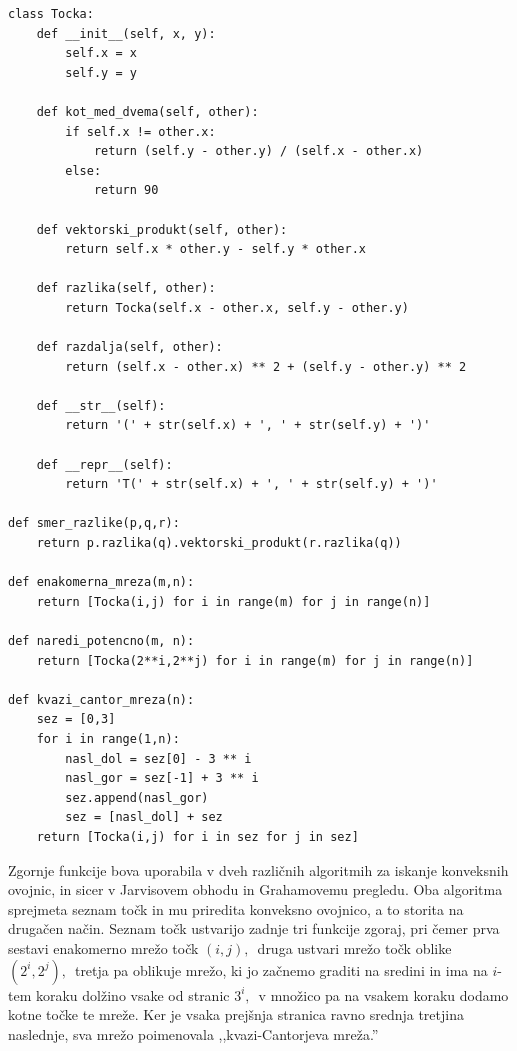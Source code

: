 \documentclass[a4paper]{article}
\begin{document}
\begin{lstlisting}
class Tocka:
    def __init__(self, x, y):
        self.x = x
        self.y = y

    def kot_med_dvema(self, other):
        if self.x != other.x:
            return (self.y - other.y) / (self.x - other.x)
        else:
            return 90

    def vektorski_produkt(self, other): 
        return self.x * other.y - self.y * other.x

    def razlika(self, other):
    	return Tocka(self.x - other.x, self.y - other.y)

    def razdalja(self, other):
        return (self.x - other.x) ** 2 + (self.y - other.y) ** 2

    def __str__(self):
        return '(' + str(self.x) + ', ' + str(self.y) + ')'

    def __repr__(self):
        return 'T(' + str(self.x) + ', ' + str(self.y) + ')'

def smer_razlike(p,q,r):
    return p.razlika(q).vektorski_produkt(r.razlika(q))

def enakomerna_mreza(m,n):
    return [Tocka(i,j) for i in range(m) for j in range(n)]

def naredi_potencno(m, n):
    return [Tocka(2**i,2**j) for i in range(m) for j in range(n)]

def kvazi_cantor_mreza(n):
    sez = [0,3]
    for i in range(1,n):
        nasl_dol = sez[0] - 3 ** i
        nasl_gor = sez[-1] + 3 ** i
        sez.append(nasl_gor)
        sez = [nasl_dol] + sez
    return [Tocka(i,j) for i in sez for j in sez]
\end{lstlisting}

Zgornje funkcije bova uporabila v dveh različnih algoritmih za iskanje konveksnih ovojnic, in sicer v Jarvisovem obhodu in Grahamovemu pregledu.
Oba algoritma sprejmeta seznam točk in mu priredita konveksno ovojnico, a to storita na drugačen način.
Seznam točk ustvarijo zadnje tri funkcije zgoraj, pri čemer prva sestavi enakomerno mrežo točk $(i, j),$~druga ustvari mrežo točk oblike $(2^i, 2^j),$~tretja pa oblikuje mrežo, ki
jo začnemo graditi na sredini in ima na $i$-tem koraku dolžino vsake od stranic $3^i,$~v množico pa na vsakem koraku dodamo kotne točke te mreže. Ker je vsaka prejšnja stranica
ravno srednja tretjina naslednje, sva mrežo poimenovala ,,kvazi-Cantorjeva mreža.''

\newpage
\end{document}
